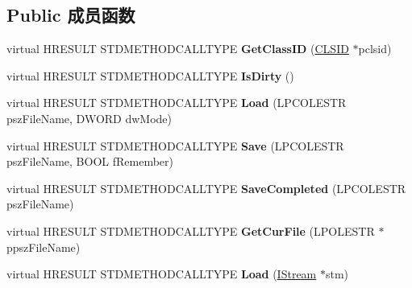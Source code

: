 \subsection*{Public 成员函数}
\begin{DoxyCompactItemize}
\item 
\mbox{\label{class_c_shell_link_a8b7015cc58b09ec37121be70291e98b0}} 
virtual H\+R\+E\+S\+U\+LT S\+T\+D\+M\+E\+T\+H\+O\+D\+C\+A\+L\+L\+T\+Y\+PE {\bfseries Get\+Class\+ID} (\hyperlink{struct___i_i_d}{C\+L\+S\+ID} $\ast$pclsid)
\item 
\mbox{\label{class_c_shell_link_a5cd6e74edc3667f925f27e6cd1447506}} 
virtual H\+R\+E\+S\+U\+LT S\+T\+D\+M\+E\+T\+H\+O\+D\+C\+A\+L\+L\+T\+Y\+PE {\bfseries Is\+Dirty} ()
\item 
\mbox{\label{class_c_shell_link_a70d2de2433392827b5a4efc90b70b30b}} 
virtual H\+R\+E\+S\+U\+LT S\+T\+D\+M\+E\+T\+H\+O\+D\+C\+A\+L\+L\+T\+Y\+PE {\bfseries Load} (L\+P\+C\+O\+L\+E\+S\+TR psz\+File\+Name, D\+W\+O\+RD dw\+Mode)
\item 
\mbox{\label{class_c_shell_link_ab87833c2eb206d8debed46cd53fd8142}} 
virtual H\+R\+E\+S\+U\+LT S\+T\+D\+M\+E\+T\+H\+O\+D\+C\+A\+L\+L\+T\+Y\+PE {\bfseries Save} (L\+P\+C\+O\+L\+E\+S\+TR psz\+File\+Name, B\+O\+OL f\+Remember)
\item 
\mbox{\label{class_c_shell_link_ab4ce3ad855995798cbebb6244afc15b8}} 
virtual H\+R\+E\+S\+U\+LT S\+T\+D\+M\+E\+T\+H\+O\+D\+C\+A\+L\+L\+T\+Y\+PE {\bfseries Save\+Completed} (L\+P\+C\+O\+L\+E\+S\+TR psz\+File\+Name)
\item 
\mbox{\label{class_c_shell_link_a7d7c92256535cbb2c6f4b102736b930d}} 
virtual H\+R\+E\+S\+U\+LT S\+T\+D\+M\+E\+T\+H\+O\+D\+C\+A\+L\+L\+T\+Y\+PE {\bfseries Get\+Cur\+File} (L\+P\+O\+L\+E\+S\+TR $\ast$ppsz\+File\+Name)
\item 
\mbox{\label{class_c_shell_link_a1e9f25e9e4fe330a8b54841c8148ac13}} 
virtual H\+R\+E\+S\+U\+LT S\+T\+D\+M\+E\+T\+H\+O\+D\+C\+A\+L\+L\+T\+Y\+PE {\bfseries Load} (\hyperlink{interface_i_stream}{I\+Stream} $\ast$stm)
\item 
\mbox{\label{class_c_shell_link_a6a3833283b4cd2d93cf6405412c5e36f}} 

\end{DoxyCompactItemize}
